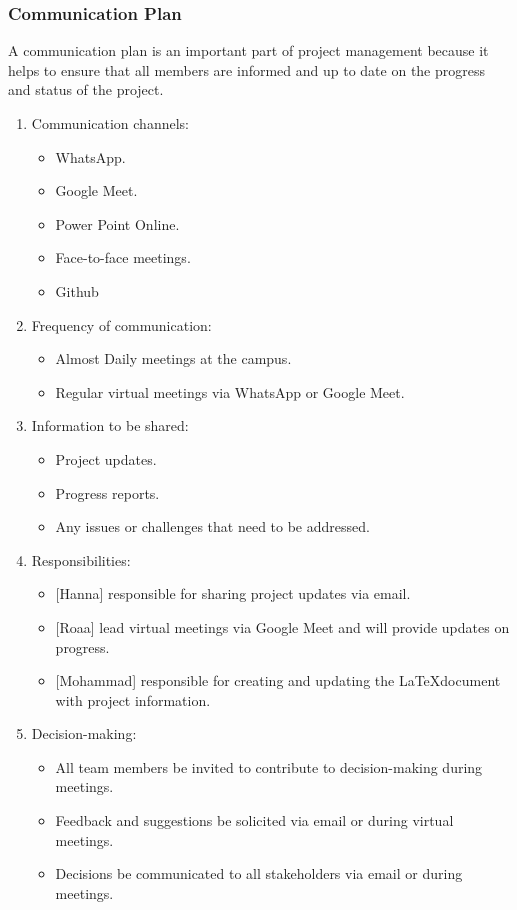 \documentclass[12pt]{article}
\begin{document}
				\subsubsection{Communication Plan}
				\quad A communication plan is an important part of project management because it helps to ensure that all members are informed and up to date on the progress and status of the project.
					\begin{enumerate}
						\item Communication channels:
							\begin{itemize}
								\item WhatsApp.
								\item Google Meet.
								\item Power Point Online.
								\item Face-to-face meetings.
								\item Github
							\end{itemize}
						\item Frequency of communication:
						\begin{itemize}
							\item Almost Daily meetings at the campus.
							\item Regular virtual meetings via WhatsApp or Google Meet.
						\end{itemize}
						\item Information to be shared:
							\begin{itemize}
								\item Project updates.
								\item Progress reports.
								\item Any issues or challenges that need to be addressed.
							\end{itemize}
						\item Responsibilities:
							\begin{itemize}
								\item {[Hanna]} responsible for sharing project updates via email.
								\item {[Roaa]} lead virtual meetings via Google Meet and will provide updates on progress.
								\item {[Mohammad]} responsible for creating and updating the \LaTeX \newline document with project information.
							\end{itemize}
						\item Decision-making:
							\begin{itemize}
								\item All team members be invited to contribute to decision-making during meetings.
								\item Feedback and suggestions be solicited via email or during virtual meetings.
								\item Decisions be communicated to all stakeholders via email or during meetings.
							\end{itemize}
					\end{enumerate}
\end{document}
